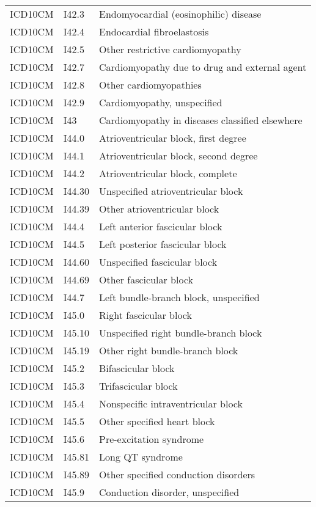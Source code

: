\begin{longtable}{p{}p{}p{}}
  ICD10CM & I42.3 & Endomyocardial (eosinophilic) disease \\ 
  ICD10CM & I42.4 & Endocardial fibroelastosis \\ 
  ICD10CM & I42.5 & Other restrictive cardiomyopathy \\ 
  ICD10CM & I42.7 & Cardiomyopathy due to drug and external agent \\ 
  ICD10CM & I42.8 & Other cardiomyopathies \\ 
  ICD10CM & I42.9 & Cardiomyopathy, unspecified \\ 
  ICD10CM & I43 & Cardiomyopathy in diseases classified elsewhere \\ 
  ICD10CM & I44.0 & Atrioventricular block, first degree \\ 
  ICD10CM & I44.1 & Atrioventricular block, second degree \\ 
  ICD10CM & I44.2 & Atrioventricular block, complete \\ 
  ICD10CM & I44.30 & Unspecified atrioventricular block \\ 
  ICD10CM & I44.39 & Other atrioventricular block \\ 
  ICD10CM & I44.4 & Left anterior fascicular block \\ 
  ICD10CM & I44.5 & Left posterior fascicular block \\ 
  ICD10CM & I44.60 & Unspecified fascicular block \\ 
  ICD10CM & I44.69 & Other fascicular block \\ 
  ICD10CM & I44.7 & Left bundle-branch block, unspecified \\ 
  ICD10CM & I45.0 & Right fascicular block \\ 
  ICD10CM & I45.10 & Unspecified right bundle-branch block \\ 
  ICD10CM & I45.19 & Other right bundle-branch block \\ 
  ICD10CM & I45.2 & Bifascicular block \\ 
  ICD10CM & I45.3 & Trifascicular block \\ 
  ICD10CM & I45.4 & Nonspecific intraventricular block \\ 
  ICD10CM & I45.5 & Other specified heart block \\ 
  ICD10CM & I45.6 & Pre-excitation syndrome \\ 
  ICD10CM & I45.81 & Long QT syndrome \\ 
  ICD10CM & I45.89 & Other specified conduction disorders \\ 
  ICD10CM & I45.9 & Conduction disorder, unspecified \\ 

\end{longtable}
